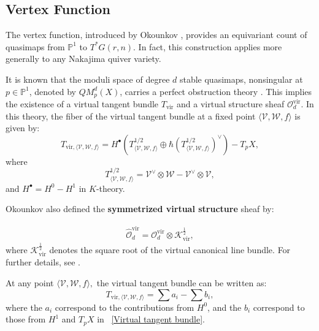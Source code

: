 \documentclass{amsart}
\begin{document}
\subsection{Vertex Function}\label{vertex function}
The vertex function, introduced by Okounkov \cite{MR3752463}, provides an equivariant count of quasimaps from $\mathbb{P}^1$ to $T^*G(r,n)$. In fact, this construction applies more generally to any Nakajima quiver variety.

It is known that the moduli space of degree $d$ stable quasimaps, nonsingular at $p \in \mathbb{P}^1$, denoted by $QM_p^d( X)$, carries a perfect obstruction theory \cite[Theorem 7.2.2]{CKM}. This implies the existence of a virtual tangent bundle $T_{\mathrm{vir}}$ and a virtual structure sheaf $\mathcal{O}^{\mathrm{vir}}_d$. 
In this theory, the fiber of the virtual tangent bundle at a fixed point $\langle\mathcal{V}, \mathcal{W}, f\rangle$ is given by:
\begin{equation}\label{Virtual tangent bundle}
{T_{\mathrm{vir},\langle\mathcal{V}, \mathcal{W},f\rangle}}
 = H^{\bullet}(T_{\langle \mathcal{V},\mathcal{W},f \rangle}^{1/2} \oplus \hbar(T_{\langle \mathcal{V},\mathcal{W},f \rangle}^{1/2})^{\vee})- T_{p}X,
\end{equation}
where
\[
T_{\langle \mathcal{V},\mathcal{W},f \rangle}^{1/2} = \mathcal{V}^{\vee} \otimes \mathcal{W} - \mathcal{V}^{\vee} \otimes \mathcal{V},
\]
and $H^{\bullet} = H^0 - H^1$ in $K$-theory. 


 Okounkov also defined the {\bf symmetrized virtual structure} sheaf by:

\begin{align*}
  \hat{\mathcal{O}}^{{\mathrm{vir}}}_d =  \mathcal{O}^{\mathrm{vir}}_d \otimes \mathcal{K}_{\mathrm{vir}}^{\frac{1}{2}},
\end{align*}
 where $\mathcal{K}_{\mathrm{vir}}^{\frac{1}{2}}$ denotes the square root of the virtual canonical line bundle. For further details, see \cite{MR3752463}.
 
     At any point $\langle \mathcal{V}, \mathcal{W}, f \rangle,$ the virtual tangent bundle can be written as:
     \[
     T_{\mathrm{vir},\langle \mathcal{V},\mathcal{W},f \rangle} = \sum a_i - \sum b_i,
     \]
    where the $a_i$ correspond to the contributions from $H^0$, and the $b_i$ correspond to those from $H^1$ and $T_pX$ in ~\eqref{Virtual tangent bundle}. 
     
\end{document}
